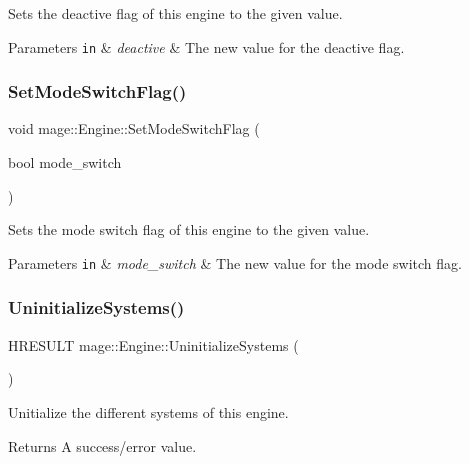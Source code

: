 Sets the deactive flag of this engine to the given value.


\begin{DoxyParams}[1]{Parameters}
\mbox{\tt in}  & {\em deactive} & The new value for the deactive flag. \\
\hline
\end{DoxyParams}
\hypertarget{classmage_1_1_engine_a8b574f0d702240d76fa98b2c79856d0d}{}\label{classmage_1_1_engine_a8b574f0d702240d76fa98b2c79856d0d} 
\subsubsection{\texorpdfstring{Set\+Mode\+Switch\+Flag()}{SetModeSwitchFlag()}}
{\footnotesize\ttfamily void mage\+::\+Engine\+::\+Set\+Mode\+Switch\+Flag (\begin{DoxyParamCaption}\item[{bool}]{mode\+\_\+switch }\end{DoxyParamCaption})}

Sets the mode switch flag of this engine to the given value.


\begin{DoxyParams}[1]{Parameters}
\mbox{\tt in}  & {\em mode\+\_\+switch} & The new value for the mode switch flag. \\
\hline
\end{DoxyParams}
\hypertarget{classmage_1_1_engine_ad760164f873e1d15aa8826d532b6d551}{}\label{classmage_1_1_engine_ad760164f873e1d15aa8826d532b6d551} 
\subsubsection{\texorpdfstring{Uninitialize\+Systems()}{UninitializeSystems()}}
{\footnotesize\ttfamily H\+R\+E\+S\+U\+LT mage\+::\+Engine\+::\+Uninitialize\+Systems (\begin{DoxyParamCaption}{ }\end{DoxyParamCaption})\hspace{0.3cm}{\ttfamily [protected]}}

Unitialize the different systems of this engine.

\begin{DoxyReturn}{Returns}
A success/error value. 
\end{DoxyReturn}


